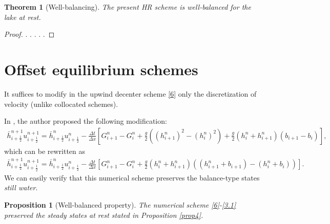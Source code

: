 \documentclass[11pt,a4paper,center,notitlepage]{article}
\numberwithin{equation}{section}
\newtheorem{prop}{Proposition}
\newtheorem{theorem}{Theorem}
\begin{document}
\begin{theorem}[Well-balancing]
The present HR scheme is well-balanced for the lake at rest.
\end{theorem}

\begin{proof}
. . . . .
\end{proof}











\section{Offset equilibrium schemes}
It suffices to modify in the upwind decenter scheme \eqref{6} only the discretization of velocity (unlike collocated schemes). 

In \cite{Doyen2014}, the author proposed the following modification:
\begin{align*}
\bar h_{i + \frac{1}{2}}^{n + 1}u_{i + \frac{1}{2}}^{n + 1} = \bar h_{i + \frac{1}{2}}^nu_{i + \frac{1}{2}}^n - \frac{{\Delta t}}{{\Delta x}}\left[ {G_{i + 1}^n - G_i^n + \frac{g}{2}\left( {{{\left( {h_{i + 1}^n} \right)}^2} - {{\left( {h_i^n} \right)}^2}} \right) + \frac{g}{2}\left( {h_i^n + h_{i + 1}^n} \right)\left( {{b_{i + 1}} - {b_i}} \right)} \right],
\end{align*}
which can be rewritten as
\begin{align}
\label{3.1}
\bar h_{i + \frac{1}{2}}^{n + 1}u_{i + \frac{1}{2}}^{n + 1} = \bar h_{i + \frac{1}{2}}^nu_{i + \frac{1}{2}}^n - \frac{{\Delta t}}{{\Delta x}}\left[ {G_{i + 1}^n - G_i^n + \frac{g}{2}\left( {h_i^n + h_{i + 1}^n} \right)\left( {\left( {h_{i + 1}^n + {b_{i + 1}}} \right) - \left( {h_i^n + {b_i}} \right)} \right)} \right].
\end{align}
We can easily verify that this numerical scheme preserves the balance-type states \textit{still water}. 

\begin{prop}[Well-balanced property]
The numerical scheme \eqref{6}-\eqref{3.1} preserved the steady states at rest stated in Proposition \ref{prop4}. 
\end{prop}
\end{document}
